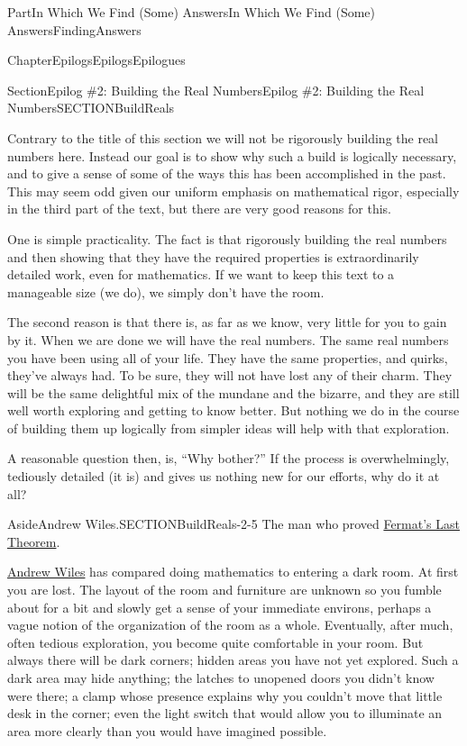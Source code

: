 \documentclass[oneside,10pt,]{book}
\numberwithin{equation}{part}
\begin{document}
\begin{partptx}{Part}{In Which We Find (Some) Answers}{}{In Which We Find (Some) Answers}{}{}{FindingAnswers}
\begin{chapterptx}{Chapter}{Epilogs}{}{Epilogs}{}{}{Epilogues}
%
%
\typeout{************************************************}
\typeout{************************************************}
%
\begin{sectionptx}{Section}{Epilog \#2: Building the Real Numbers}{}{Epilog \#2: Building the Real Numbers}{}{}{SECTIONBuildReals}
\begin{introduction}{}%
Contrary to the title of this section we will not be rigorously building the real numbers here.  Instead our goal is to show why such a build is logically necessary, and to give a sense of some of the ways this has been accomplished in the past.  This may seem odd given our uniform emphasis on mathematical rigor, especially in the third part of the text, but there are very good reasons for this.%
\par
One is simple practicality.  The fact is that rigorously building the real numbers and then showing that they have the required properties is extraordinarily detailed work, even for mathematics.  If we want to keep this text to a manageable size (we do), we simply don't have the room.%
\par
The second reason is that there is, as far as we know, very little for you to gain by it.  When we are done we will have the real numbers.  The same real numbers you have been using all of your life.  They have the same properties, and quirks, they've always had.  To be sure, they will not have lost any of their charm. They will be the same delightful mix of the mundane and the bizarre, and they are still well worth exploring and getting to know better.  But nothing we do in the course of building them up logically from simpler ideas will help with that exploration.%
\par
A reasonable question then, is, ``Why bother?'' If the process is overwhelmingly, tediously detailed (it is) and gives us nothing new for our efforts, why do it at all?%
\begin{aside}{Aside}{Andrew Wiles.}{SECTIONBuildReals-2-5}%
The man who proved \href{https://mathshistory.st-andrews.ac.uk/HistTopics/Fermat's_last_theorem/}{Fermat's Last Theorem}.%
\end{aside}
\href{https://mathshistory.st-andrews.ac.uk/Biographies/Wiles/}{Andrew Wiles} has compared doing mathematics to entering a dark room. At first you are lost.  The layout of the room and furniture are unknown so you fumble about for a bit and slowly get a sense of your immediate environs, perhaps a vague notion of the organization of the room as a whole.  Eventually, after much, often tedious exploration, you become quite comfortable in your room.  But always there will be dark corners; hidden areas you have not yet explored.  Such a dark area may hide anything; the latches to unopened doors you didn't know were there; a clamp whose presence explains why you couldn't move that little desk in the corner; even the light switch that would allow you to illuminate an area more clearly than you would have imagined possible.%

\end{introduction}
\end{sectionptx}
\end{chapterptx}
\end{partptx}
\end{document}
